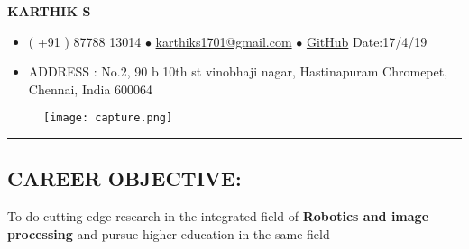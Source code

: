 \documentclass[10pts]{report}
\newcommand{\tab}[1]{\hspace{.2667\textwidth}\rlap{#1}}
\begin{document}
\centering 
 \textbf{KARTHIK S  }     


\begin{itemize}         

\item( +91 ) 87788 13014 
 $\bullet$  \href{mailto:karthiks1701@gmail.com}{karthiks1701@gmail.com}
 $\bullet$ \href{https://github.com/karthiks1701/karthiks1701}{GitHub}  \tab{} Date:17/4/19
\item{ ADDRESS : No.2, 90 b 10th st vinobhaji nagar, Hastinapuram Chromepet, Chennai, India 600064}
\end{itemize}

                           
                         


\begin{figure}{}

\centering
\graphicspath{{./images/}}
\texttt{[image: capture.png]}


\end{figure}


\par\noindent\rule{\textwidth}{0.4pt}
\begin{flushleft}
         \section*{CAREER OBJECTIVE:}
                  To do cutting-edge research in the integrated field of  \textbf{Robotics and image processing} and pursue higher education in the same field   
\end{flushleft}
\end{document}

